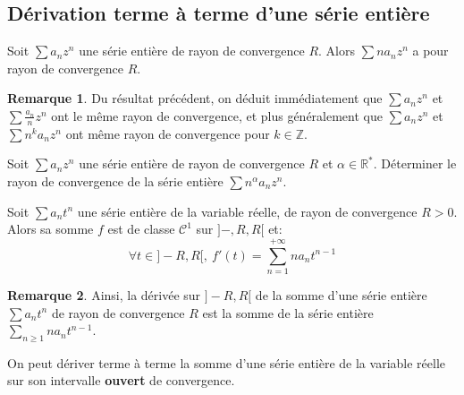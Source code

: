 \documentclass[french]{article}
\newcommand{\Z}{\mathbb{Z}}
\newcommand{\R}{\mathbb{R}}
\newcommand{\st}{^*}
\theoremstyle{plain}
\theoremstyle{definition}
\newtheorem*{rmq}{Remarque}
\theoremstyle{remark}
\begin{document}
\subsection{Dérivation terme à terme d'une série entière}

\begin{prop}%
	Soit $\displaystyle\sum a_nz^n$ une série entière de rayon de convergence $R$. Alors $\displaystyle\sum na_nz^n$ a pour rayon de convergence $R$.
\end{prop}

\begin{rmq}
	Du résultat précédent, on déduit immédiatement que $\displaystyle\sum a_nz^n$ et $\displaystyle\sum\frac{a_n}{n}z^n$ ont le même rayon de convergence, et plus généralement que $\displaystyle\sum a_nz^n$ et $\displaystyle\sum n^k a_nz^n$ ont même rayon de convergence pour $k\in\Z$.
\end{rmq}

\begin{exo}
	Soit $\displaystyle\sum a_nz^n$ une série entière de rayon de convergence $R$ et $\alpha\in\R\st$. Déterminer le rayon de convergence de la série entière $\displaystyle\sum n^\alpha a_nz^n$. 
\end{exo}

\begin{thm}%
	Soit $\displaystyle\sum a_nt^n$ une série entière de la variable réelle, de rayon de convergence $R>0$. Alors sa somme $f$ est de classe $\mathcal{C}^1$ sur $]-,R,R[$ et: $$\forall t\in]-R,R[,\ f'(t)=\sum_{n=1}^{+\infty}na_nt^{n-1}$$
\end{thm}

\begin{rmq}
	Ainsi, la dérivée sur $]-R,R[$ de la somme d'une série entière $\displaystyle\sum a_nt^n$ de rayon de convergence $R$ est la somme de la série entière $\displaystyle\sum_{n\geqslant1}na_nt^{n-1}$.
\end{rmq}

\begin{met}
	On peut dériver terme à terme la somme d'une série entière de la variable réelle sur son intervalle \textbf{ouvert} de convergence.
\end{met}
\end{document}
